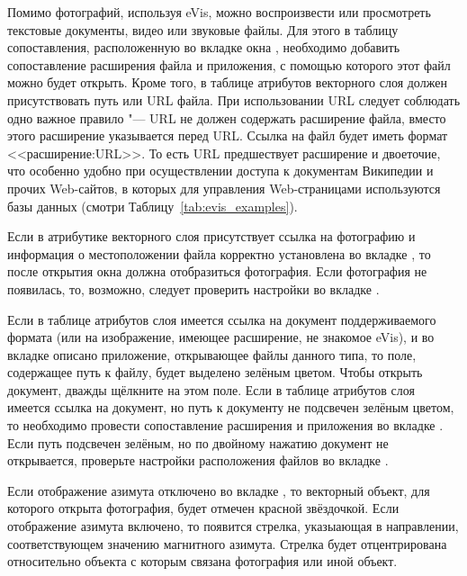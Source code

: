 \label{evis_location}

Помимо фотографий, используя eVis, можно воспроизвести или просмотреть
текстовые документы, видео или звуковые файлы. Для этого в таблицу
сопоставления, расположенную во вкладке  окна
, необходимо добавить сопоставление расширения
файла и приложения, с помощью которого этот файл можно будет открыть. Кроме
того, в таблице атрибутов векторного слоя должен присутствовать путь или URL
файла. При использовании URL следует соблюдать одно важное правило "--- URL
не должен содержать расширение файла, вместо этого расширение указывается
перед URL. Ссылка на файл будет иметь формат <<расширение:URL>>. То есть URL
предшествует расширение и двоеточие, что особенно удобно при осуществлении
доступа к документам Википедии и прочих Web-сайтов, в которых для управления
Web-страницами используются базы данных (смотри Таблицу~\ref{tab:evis_examples}).

\label{evis_using_browser}

Если в атрибутике векторного слоя присутствует ссылка на фотографию и
информация о местоположении файла корректно установлена во вкладке
, то после открытия окна  должна
отобразиться фотография. Если фотография не появилась, то, возможно,
следует проверить настройки во вкладке .

Если в таблице атрибутов слоя имеется ссылка на документ поддерживаемого
формата (или на изображение, имеющее расширение, не знакомое eVis), и во
вкладке  описано приложение, открывающее файлы
данного типа, то поле, содержащее путь к файлу, будет выделено зелёным
цветом. Чтобы открыть документ, дважды щёлкните на этом поле. Если в
таблице атрибутов слоя имеется ссылка на документ, но путь к документу
не подсвечен зелёным цветом, то необходимо провести сопоставление расширения
и приложения во вкладке . Если путь подсвечен
зелёным, но по двойному нажатию документ не открывается, проверьте
настройки расположения файлов во вкладке .

Если отображение азимута отключено во вкладке , то векторный
объект, для которого открыта фотография, будет отмечен красной звёздочкой.
Если отображение азимута включено, то появится стрелка, указыающая в
направлении, соответствующем значению магнитного азимута. Стрелка будет
отцентрирована относительно объекта с которым связана фотография или иной объект.

